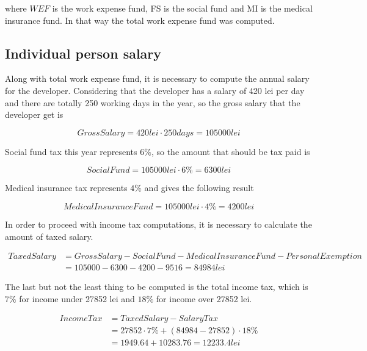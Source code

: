 \noindent
where $WEF$ is the work expense fund, FS is the social fund and MI is the medical insurance fund. In that way the total work expense fund was computed. 

\subsection{Individual person salary}
Along with total work expense fund, it is necessary to compute the annual salary for the developer. Considering that the developer has a salary of 420 lei per day and there are totally 250 working days in the year, so the gross salary that the developer get is

\begin{equation}
 Gross Salary = 420 lei \cdot 250 days = 105000 lei
\end{equation}

Social fund tax this year represents $6\%$, so the amount that should be tax paid is

\begin{equation}
 Social Fund = 105000 lei \cdot 6\% = 6300 lei
\end{equation}

Medical insurance tax represents $4\%$ and gives the following result

\begin{equation}
 Medical Insurance Fund = 105000 lei \cdot 4\% = 4200 lei
\end{equation}

In order to proceed with income tax computations, it is necessary to calculate the amount of taxed salary.

\begin{equation}
\begin{split}
 Taxed Salary &= Gross Salary - Social Fund - Medical Insurance Fund - Personal Exemption \\
              &= 105000 - 6300 - 4200 - 9516 = 84984 lei
\end{split}
\end{equation}

The last but not the least thing to be computed is the total income tax, which is $7\%$ for income under 27852 lei and $18\%$ for income over 27852 lei.

\begin{equation}
\begin{split}
 Income Tax &= Taxed Salary - Salary Tax \\
	    &= 27852 \cdot 7\% + (84984 - 27852) \cdot 18\% \\
	    & = 1949.64 + 10283.76 = 12233.4 lei
 \end{split}
\end{equation}

